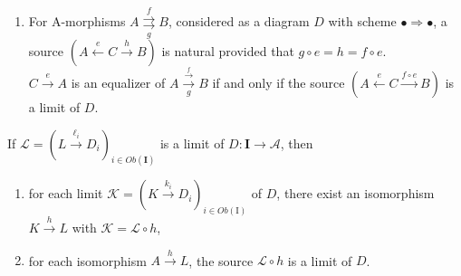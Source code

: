 \begin{prop}
    
\begin{enumerate}

    \item For A-morphisms $A \underset{g}{\stackrel{f}{\rightrightarrows}} B$, considered as a diagram $D$ with scheme $\bullet \Rightarrow \bullet$, a source $(A \stackrel{e}{\longleftarrow} C \xrightarrow{h} B)$ is natural provided that $g \circ e=h=f \circ e$.\\
    $C \xrightarrow{e} A$ is an equalizer of $A \xrightarrow[g]{\stackrel{f}{\longrightarrow}} B$ if and only if the source $(A \stackrel{e}{\leftarrow} C \xrightarrow{f \circ e} B)$ is a limit of $D$. 
\end{enumerate}
\end{prop}

\begin{prop}[Uniqueness]
If $\mathcal{L}=\left(L \xrightarrow{\ell_i} D_i\right)_{i \in O b(\mathbf{I})}$ is a limit of $D: \mathbf{I} \rightarrow \mathcal{A}$, then
    \begin{enumerate}
        \item for each limit $\mathcal{K}=\left(K \xrightarrow{k_i} D_i\right)_{i \in O b(\mathrm{I})}$ of $D$, there exist an isomorphism $K \xrightarrow{h} L$ with $\mathcal{K}=\mathcal{L} \circ h$,
        \item for each isomorphism $A \xrightarrow{h} L$, the source $\mathcal{L} \circ h$ is a limit of $D$.
    \end{enumerate}
\end{prop}



